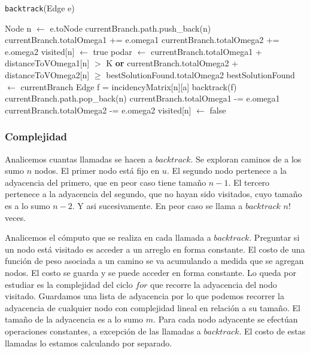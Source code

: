 \begin{algorithm}[H]
    \caption{\texttt{backtrack}(Edge e)}
\begin{algorithmic}[1]
  \State Node n $\leftarrow$ e.toNode
  \State currentBranch.path.push\_back(n)
  \State currentBranch.totalOmega1 += e.omega1
  \State currentBranch.totalOmega2 += e.omega2
  \State visited[n] $\leftarrow$ true
  \State podar $\leftarrow$ currentBranch.totalOmega1 + distanceToVOmega1[n] $>$ K \textbf{or} currentBranch.totalOmega2 + distanceToVOmega2[n] $\geq$ bestSolutionFound.totalOmega2
      \State bestSolutionFound $\leftarrow$ currentBranch
  \Else{}
          \State Edge f = incidencyMatrix[n][a]
          \State backtrack(f)
	\EndIf
      \EndFor
  \EndIf
  \EndIf
  \State currentBranch.path.pop\_back(n)
  \State currentBranch.totalOmega1 -= e.omega1
  \State currentBranch.totalOmega2 -= e.omega2
  \State visited[n] $\leftarrow$ false
\end{algorithmic}
\end{algorithm}

\subsubsection{Complejidad}

Analicemos cuantas llamadas se hacen a $backtrack$. Se exploran caminos de a los sumo $n$ nodos. El primer nodo está fijo en $u$. El segundo nodo
pertenece a la adyacencia del primero, que en peor caso tiene tamaño $n - 1$. El tercero pertenece a la adyacencia del segundo, que no hayan sido
visitados, cuyo tamaño es a lo sumo $n - 2$. Y asi sucesivamente. En peor caso se llama a $backtrack$ $n!$ veces.

Analicemos el cómputo que se realiza en cada llamada a $backtrack$. Preguntar si un nodo está visitado es acceder a un arreglo en forma constante.
El costo de una función de peso asociada a un camino se va acumulando a medida que se agregan nodos. El costo se guarda y se puede acceder en
forma constante. Lo queda por estudiar es la complejidad del ciclo $for$ que recorre la adyacencia del nodo visitado. Guardamos una lista de
adyacencia por lo que podemos recorrer la adyacencia de cualquier nodo con complejidad lineal en relación a su tamaño. El tamaño de la adyacencia
es a lo sumo $m$. Para cada nodo adyacente se efectúan operaciones constantes, a excepción de las llamadas a $backtrack$. El costo de estas
llamadas lo estamos calculando por separado.

